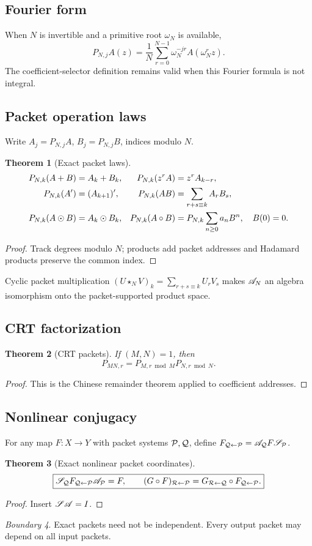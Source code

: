 \documentclass[11pt]{article}
\newtheorem{theorem}{Theorem}[section]\newtheorem{proposition}[theorem]{Proposition}\newtheorem{lemma}[theorem]{Lemma}\newtheorem{corollary}[theorem]{Corollary}
\theoremstyle{definition}\newtheorem{definition}[theorem]{Definition}\newtheorem{example}[theorem]{Example}\newtheorem{construction}[theorem]{Construction}\newtheorem{algorithm}[theorem]{Algorithm}\newtheorem{conjecture}[theorem]{Conjecture}\newtheorem{problem}[theorem]{Problem}
\theoremstyle{remark}\newtheorem{remark}[theorem]{Remark}\newtheorem{boundary}[theorem]{Boundary}\newtheorem{certificate}[theorem]{Computational Certificate}\newtheorem{classical}[theorem]{Classical Input}\newtheorem{principle}[theorem]{Structural Principle}
\begin{document}
\subsection{Fourier form}
When $N$ is invertible and a primitive root $\omega_N$ is available,
\[\boxed{P_{N,j}A(z)=\frac1N\sum_{r=0}^{N-1}\omega_N^{-jr}A(\omega_N^rz).}\]
The coefficient-selector definition remains valid when this Fourier formula is not integral.
\subsection{Packet operation laws}
Write $A_j=P_{N,j}A$, $B_j=P_{N,j}B$, indices modulo $N$.
\begin{theorem}[Exact packet laws]
\begin{align*}P_{N,k}(A+B)&=A_k+B_k,&P_{N,k}(z^rA)&=z^rA_{k-r},\\P_{N,k}(A')&=(A_{k+1})',&P_{N,k}(AB)&=\sum_{r+s\equiv k}A_rB_s,\\P_{N,k}(A\mathbin{\odot} B)&=A_k\mathbin{\odot} B_k,&P_{N,k}(A\circ B)&=P_{N,k}\sum_{n\ge0}a_nB^n,\quad B(0)=0.
\end{align*}
\end{theorem}
\begin{proof}Track degrees modulo $N$; products add packet addresses and Hadamard products preserve the common index.\end{proof}
Cyclic packet multiplication $(U\star_NV)_k=\sum_{r+s\equiv k}U_rV_s$ makes $\mathscr A_N$ an algebra isomorphism onto the packet-supported product space.
\subsection{CRT factorization}
\begin{theorem}[CRT packets]
If $(M,N)=1$, then
\[\boxed{P_{MN,r}=P_{M,r\bmod M}P_{N,r\bmod N}.}\]
\end{theorem}
\begin{proof}This is the Chinese remainder theorem applied to coefficient addresses.\end{proof}
\subsection{Nonlinear conjugacy}
For any map $F:X\to Y$ with packet systems $\mathcal P,\mathcal Q$, define $F_{\mathcal Q\leftarrow\mathcal P}=\mathscr A_{\mathcal Q}F\mathscr S_{\mathcal P}$.
\begin{theorem}[Exact nonlinear packet coordinates]
\[\boxed{\mathscr S_{\mathcal Q}F_{\mathcal Q\leftarrow\mathcal P}\mathscr A_{\mathcal P}=F,\qquad(G\circ F)_{\mathcal R\leftarrow\mathcal P}=G_{\mathcal R\leftarrow\mathcal Q}\circ F_{\mathcal Q\leftarrow\mathcal P}.}\]
\end{theorem}
\begin{proof}Insert $\mathscr S\mathscr A=I$.\end{proof}
\begin{boundary}Exact packets need not be independent. Every output packet may depend on all input packets.\end{boundary}
\end{document}
